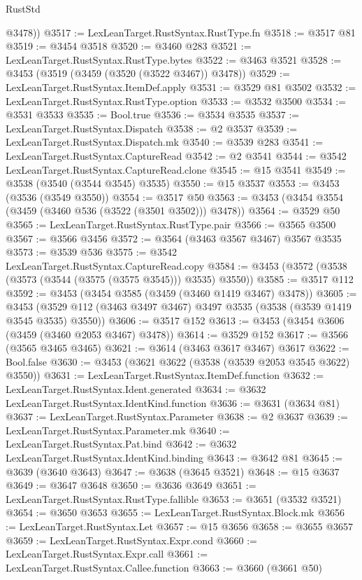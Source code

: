 \begin{lexlean}{RustStd}
\begin{coremodule}
        @3478))
@3517 := LexLeanTarget.RustSyntax.RustType.fn
@3518 := @3517 @81
@3519 := @3454 @3518
@3520 := @3460 @283
@3521 := LexLeanTarget.RustSyntax.RustType.bytes
@3522 := @3463 @3521
@3528 := @3453 (@3519 (@3459 (@3520 (@3522 @3467)) @3478))
@3529 := LexLeanTarget.RustSyntax.ItemDef.apply
@3531 := @3529 @81 @3502
@3532 := LexLeanTarget.RustSyntax.RustType.option
@3533 := @3532 @3500
@3534 := @3531 @3533
@3535 := Bool.true
@3536 := @3534 @3535
@3537 := LexLeanTarget.RustSyntax.Dispatch
@3538 := @2 @3537
@3539 := LexLeanTarget.RustSyntax.Dispatch.mk
@3540 := @3539 @283
@3541 := LexLeanTarget.RustSyntax.CaptureRead
@3542 := @2 @3541
@3544 := @3542 LexLeanTarget.RustSyntax.CaptureRead.clone
@3545 := @15 @3541
@3549 := @3538 (@3540 (@3544 @3545) @3535)
@3550 := @15 @3537
@3553 := @3453 (@3536 (@3549 @3550))
@3554 := @3517 @50
@3563 := @3453 (@3454 @3554 (@3459 (@3460 @536 (@3522 (@3501 @3502))) @3478))
@3564 := @3529 @50
@3565 := LexLeanTarget.RustSyntax.RustType.pair
@3566 := @3565 @3500
@3567 := @3566 @3456
@3572 := @3564 (@3463 @3567 @3467) @3567 @3535
@3573 := @3539 @536
@3575 := @3542 LexLeanTarget.RustSyntax.CaptureRead.copy
@3584 := @3453 (@3572 (@3538 (@3573 (@3544 (@3575 (@3575 @3545))) @3535) @3550))
@3585 := @3517 @112
@3592 := @3453 (@3454 @3585 (@3459 (@3460 @1419 @3467) @3478))
@3605 := @3453 (@3529 @112 (@3463 @3497 @3467) @3497 @3535 (@3538 (@3539 @1419 @3545 @3535) @3550))
@3606 := @3517 @152
@3613 := @3453 (@3454 @3606 (@3459 (@3460 @2053 @3467) @3478))
@3614 := @3529 @152
@3617 := @3566 (@3565 @3465 @3465)
@3621 := @3614 (@3463 @3617 @3467) @3617
@3622 := Bool.false
@3630 := @3453 (@3621 @3622 (@3538 (@3539 @2053 @3545 @3622) @3550))
@3631 := LexLeanTarget.RustSyntax.ItemDef.function
@3632 := LexLeanTarget.RustSyntax.Ident.generated
@3634 := @3632 LexLeanTarget.RustSyntax.IdentKind.function
@3636 := @3631 (@3634 @81)
@3637 := LexLeanTarget.RustSyntax.Parameter
@3638 := @2 @3637
@3639 := LexLeanTarget.RustSyntax.Parameter.mk
@3640 := LexLeanTarget.RustSyntax.Pat.bind
@3642 := @3632 LexLeanTarget.RustSyntax.IdentKind.binding
@3643 := @3642 @81
@3645 := @3639 (@3640 @3643)
@3647 := @3638 (@3645 @3521)
@3648 := @15 @3637
@3649 := @3647 @3648
@3650 := @3636 @3649
@3651 := LexLeanTarget.RustSyntax.RustType.fallible
@3653 := @3651 (@3532 @3521)
@3654 := @3650 @3653
@3655 := LexLeanTarget.RustSyntax.Block.mk
@3656 := LexLeanTarget.RustSyntax.Let
@3657 := @15 @3656
@3658 := @3655 @3657
@3659 := LexLeanTarget.RustSyntax.Expr.cond
@3660 := LexLeanTarget.RustSyntax.Expr.call
@3661 := LexLeanTarget.RustSyntax.Callee.function
@3663 := @3660 (@3661 @50)

\end{coremodule}
\end{lexlean}

